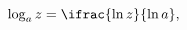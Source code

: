 \[\mathop{\mathrm{log}_{a}\/}\nolimits z=\ifrac{\mathop{\ln\/}\nolimits z}{%
\mathop{\ln\/}\nolimits a},\]